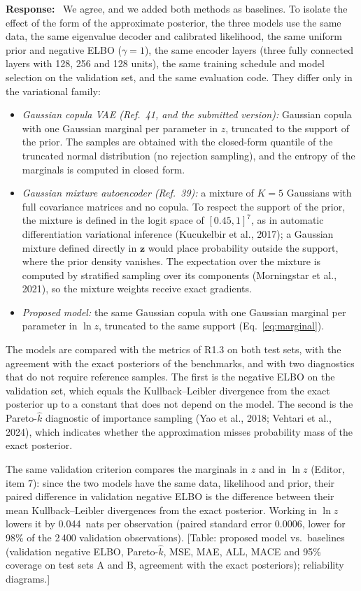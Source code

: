 \documentclass[11pt]{article}
\newenvironment{response}{\par\smallskip\noindent\color{resp}\textbf{Response:}\ }{\par}
\newcommand{\tbd}[1]{\textcolor{note}{\textsf{[#1]}}}
\newcommand{\z}{\mathbf{z}}
\begin{document}
\begin{response}
We agree, and we added both methods as baselines. To isolate the effect of the form of the approximate posterior, the
three models use the same data, the same eigenvalue decoder and calibrated likelihood, the same uniform prior and
negative ELBO ($\gamma=1$), the same encoder layers (three fully connected layers with 128, 256 and 128 units), the same
training schedule and model selection on the validation set, and the same evaluation code. They differ only in the
variational family:
\begin{itemize}[leftmargin=*]
\item \emph{Gaussian copula VAE (Ref.~41, and the submitted version):} Gaussian copula with one Gaussian marginal per
parameter in $z$, truncated to the support of the prior. The samples are obtained with the closed-form quantile of the
truncated normal distribution (no rejection sampling), and the entropy of the marginals is computed in closed form.
\item \emph{Gaussian mixture autoencoder (Ref.~39):} a mixture of $K=5$ Gaussians with full covariance matrices and no
copula. To respect the support of the prior, the mixture is defined in the logit space of $[0.45,1]^7$, as in automatic
differentiation variational inference (Kucukelbir et al., 2017); a Gaussian mixture defined directly in $\z$ would place
probability outside the support, where the prior density vanishes. The expectation over the mixture is computed by
stratified sampling over its components (Morningstar et al., 2021), so the mixture weights receive exact gradients.
\item \emph{Proposed model:} the same Gaussian copula with one Gaussian marginal per parameter in $\ln z$, truncated to
the same support (Eq.~\eqref{eq:marginal}).
\end{itemize}
The models are compared with the metrics of R1.3 on both test sets, with the agreement with the exact posteriors of the
benchmarks, and with two diagnostics that do not require reference samples. The first is the negative ELBO on the
validation set, which equals the Kullback--Leibler divergence from the exact posterior up to a constant that does not
depend on the model. The second is the Pareto-$\hat{k}$ diagnostic of importance sampling (Yao et al., 2018; Vehtari
et al., 2024), which indicates whether the approximation misses probability mass of the exact posterior.

The same validation criterion compares the marginals in $z$ and in $\ln z$ (Editor, item 7): since the two models have
the same data, likelihood and prior, their paired difference in validation negative ELBO is the difference between
their mean Kullback--Leibler divergences from the exact posterior. Working in $\ln z$ lowers it by 0.044~nats per
observation (paired standard error 0.0006, lower for 98\% of the 2\,400 validation observations).
\tbd{Table: proposed model vs.\ baselines (validation negative ELBO, Pareto-$\hat{k}$, MSE, MAE, ALL, MACE and 95\%
coverage on test sets A and B, agreement with the exact posteriors); reliability diagrams.}
\end{response}
\end{document}
